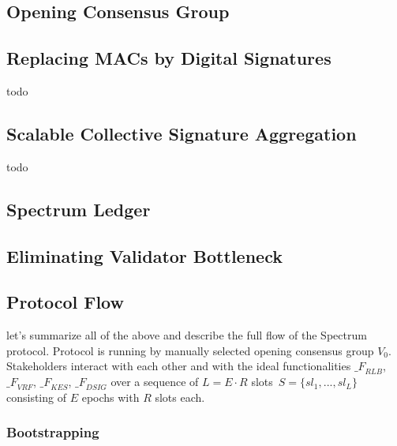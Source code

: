 \subsection{Opening Consensus Group}\label{subsec:opening-consensus-group-and-leaders}


\subsection{Replacing MACs by Digital Signatures}\label{subsec:replacing-macs-by-digital-signatures}

todo

\subsection{Scalable Collective Signature Aggregation}\label{subsec:scalable-collective-signature-aggregation}

todo

\subsection{Spectrum Ledger}\label{subsec:ledger}


\subsection{Eliminating Validator Bottleneck}\label{subsec:eliminating-validator-bottleneck}


\subsection{Protocol Flow}\label{subsec:protocol-flow}
let's summarize all of the above and describe the full flow of the Spectrum protocol.
Protocol is running by manually selected opening consensus group $V_0$.
Stakeholders interact with each other and with the ideal functionalities ${\mathcal_{F}}_{RLB}$,\
${\mathcal_{F}}_{VRF}$, ${\mathcal_{F}}_{KES}$, ${\mathcal_{F}}_{DSIG}$ over a sequence of $L = E \cdot R$ slots\
${S=\{sl_1,...,sl_L\}}$ consisting of $E$ epochs with $R$ slots each.

\subsubsection{Bootstrapping}\label{subsubsec:bootstrapping}


